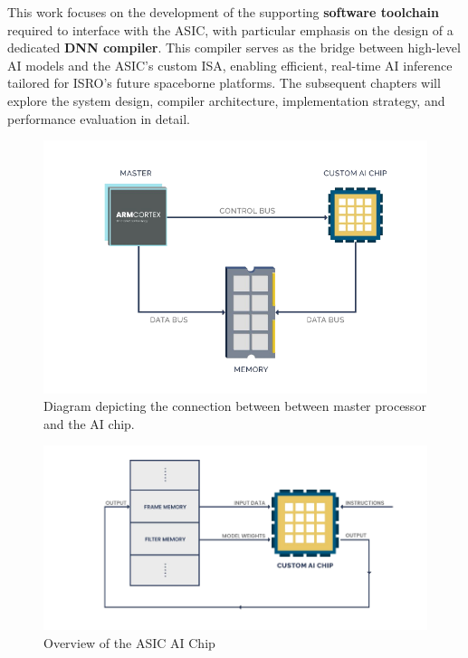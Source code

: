 \documentclass[12pt]{report}
\begin{document}
This work focuses on the development of the supporting \textbf{software toolchain} required to interface with the ASIC, with particular emphasis on the design of a dedicated \textbf{DNN compiler}. This compiler serves as the bridge between high-level AI models and the ASIC's custom ISA, enabling efficient, real-time AI inference tailored for ISRO's future spaceborne platforms. The subsequent chapters will explore the system design, compiler architecture, implementation strategy, and performance evaluation in detail.

\begin{figure}[!b]
    \centering
    \includegraphics[width=\textwidth]{system_overview1.png}
    \caption{Diagram depicting the connection between between master processor and the AI chip.}
    \label{label5}
\end{figure}


\begin{figure}[!b]
    \centering
    \includegraphics[width=\textwidth]{asic_data_flow1.png}
    \caption{Overview of the ASIC AI Chip}
    \label{label3}
\end{figure}
\end{document}
